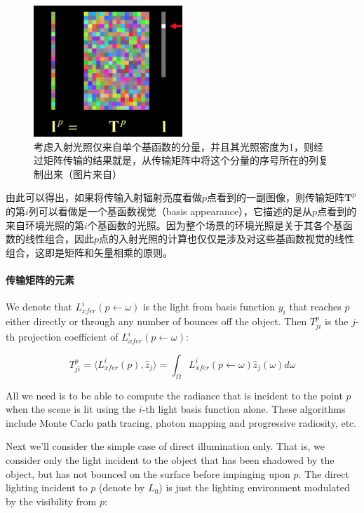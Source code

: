 \begin{figure}
\sidecaption
	\includegraphics[width=0.5\textwidth]{figures/prt/prt-11}
	\caption{考虑入射光照仅来自单个基函数的分量，并且其光照密度为1，则经过矩阵传输的结果就是，从传输矩阵中将这个分量的序号所在的列复制出来（图片来自\cite{a:PrecomputedRadianceTransfer:TheoryandPractice}）}
	\label{f:pl-matrix}
\end{figure}

由此可以得出，如果将传输入射辐射亮度看做$p$点看到的一副图像，则传输矩阵$\mathbf{T}^{p}$的第$i$列可以看做是一个基函数视觉（basis appearance），它描述的是从$p$点看到的来自环境光照的第$i$个基函数的光照。因为整个场景的环境光照是关于其各个基函数的线性组合，因此$p$点的入射光照的计算也仅仅是涉及对这些基函数视觉的线性组合，这即是矩阵和矢量相乘的原则。



\paragraph{传输矩阵的元素}
We denote that $L^{i}_{xfer}(p\leftarrow\omega)$ is the light from basis function $y_i$ that reaches $p$ either directly or through any number of bounces off the object. Then $T^{p}_{ji}$ is the $j$-th projection coefficient of $L^{i}_{xfer}(p\leftarrow\omega)$:

\begin{equation*}
	T^{p}_{ji}=\langle L^{i}_{xfer}(p),\hat{z}_j\rangle =\int_\Omega L^{i}_{xfer}(p\leftarrow\omega)\hat{z}_j(\omega)d\omega
\end{equation*}

All we need is to be able to compute the radiance that is incident to the point $p$ when the scene is lit using the $i$-th light basis function alone. These algorithms include Monte Carlo path tracing, photon mapping and progressive radiosity, etc. 

Next we'll consider the simple case of direct illumination only. That is, we consider only the light incident to the object that has been shadowed by the object, but has not bounced on the surface before impinging upon $p$. The direct lighting incident to $p$ (denote by $L_0$) is just the lighting environment modulated by the visibility from $p$:

